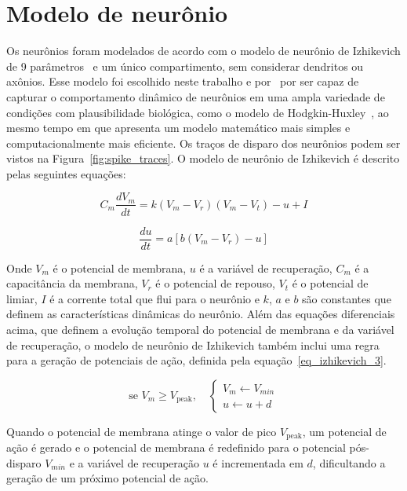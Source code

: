 

\section{Modelo de neurônio}

Os neurônios foram modelados de acordo com o modelo de neurônio de Izhikevich de 9
parâmetros~\cite[cap.~8]{izhikevichDynamical2006} e um único compartimento, sem considerar dendritos ou axônios. Esse modelo foi
escolhido neste trabalho e por~ por ser capaz de capturar o comportamento dinâmico de
neurônios em uma ampla variedade de condições com plausibilidade biológica, como o modelo de
Hodgkin-Huxley~\cite{hodgkinQuantitative1952b}, ao mesmo tempo em que apresenta um modelo matemático mais simples e
computacionalmente mais eficiente. Os traços de disparo dos neurônios podem ser vistos na Figura~\ref{fig:spike_traces}. O modelo
de neurônio de Izhikevich é descrito pelas seguintes equações:


\begin{equation}
\label{eq_izhikevich_1}
C_m \frac{dV_m}{dt} = k (V_m - V_r)(V_m - V_t) - u + I
\end{equation}

\begin{equation}
\label{eq_izhikevich_2}
\frac{du}{dt} = a [b(V_m-V_r) - u]
\end{equation}

Onde $V_m$ é o potencial de membrana, $u$ é a variável de recuperação, $C_m$ é a capacitância da membrana, $V_r$ é o
potencial de repouso, $V_t$ é o potencial de limiar, $I$ é a corrente total que flui para o neurônio e $k$, $a$ e $b$ são
constantes que definem as características dinâmicas do neurônio. Além das equações diferenciais acima, que definem a evolução
temporal do potencial de membrana e da variável de recuperação, o modelo de neurônio de Izhikevich também inclui uma regra para
a geração de potenciais de ação, definida pela equação~\ref{eq_izhikevich_3}.

\begin{equation}
\label{eq_izhikevich_3}
\text{se } V_m \geq V_{\text{peak}}, \quad
\begin{cases}
V_m \gets V_{min} \\
u \gets u + d
\end{cases}
\end{equation}

Quando o potencial de membrana atinge o valor de pico $V_{\text{peak}}$, um potencial de ação é gerado e o potencial de membrana é
redefinido para o potencial pós-disparo $V_{min}$ e a variável de recuperação $u$ é incrementada em $d$, dificultando a geração de
um próximo potencial de ação.


